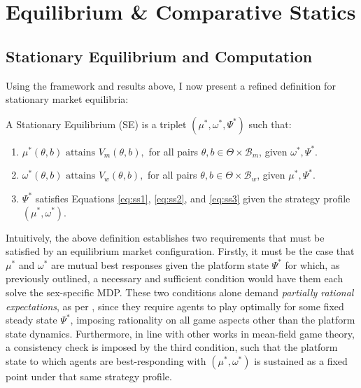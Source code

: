 \section{Equilibrium \& Comparative Statics}
\label{sec:section3} 
\subsection{Stationary Equilibrium and Computation}\label{sec:section3.1} 
Using the framework and results above, I now present a refined definition for stationary market equilibria: 
\begin{definition}
    A Stationary Equilibrium (SE) is a triplet $(\mu^*, \omega^*, \Psi^*)$ such that:
    \begin{enumerate}
        \item $ \mu^*(\theta,b) \text{ attains } V_m(\theta,b),$ for all pairs $\theta, b \in \Theta \times \mathcal{B}_m$, given $\omega^*,\Psi^*$.
        \item $ \omega^*(\theta,b) \text{ attains } V_w(\theta,b),$ for all pairs $\theta, b \in \Theta \times \mathcal{B}_w$, given $\mu^*,\Psi^*$.
        \item $\Psi^*$ satisfies Equations \ref{eq:ss1}, \ref{eq:ss2}, and \ref{eq:ss3} given the strategy profile $(\mu^*, \omega^*)$.
    \end{enumerate} 
\end{definition}

Intuitively, the above definition establishes two requirements that must be satisfied by an equilibrium market configuration. 
Firstly, it must be the case that $\mu^*$ and $\omega^*$ are mutual best responses given the platform state $\Psi^*$ for which, as previously outlined, a necessary and sufficient condition would have them each solve the sex-specific MDP. 
These two conditions alone demand \textit{partially rational expectations}, as per \cite{burdett1997marriage}, since they require agents to play optimally for some fixed steady state $\Psi^*$, imposing rationality on all game aspects other than the platform state dynamics. 
Furthermore, in line with other works in mean-field game theory, a consistency check is imposed by the third condition, such that the platform state to which agents are best-responding with $(\mu^*,\omega^*)$ is sustained as a fixed point under that same strategy profile.

